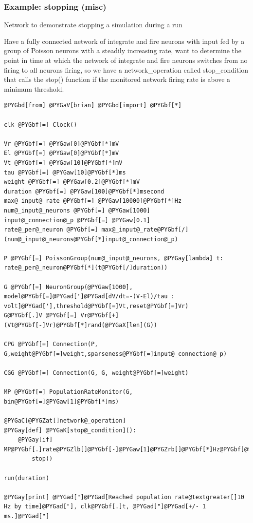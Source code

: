\documentclass[letterpaper,10pt,english]{manual}
\begin{document}
\resetcurrentobjects
\hypertarget{--doc-examples-misc_stopping}{}

\hypertarget{index-85}{}\subsubsection{Example: stopping (misc)}

Network to demonstrate stopping a simulation during a run

Have a fully connected network of integrate and fire neurons
with input fed by a group of Poisson neurons with a steadily
increasing rate, want to determine the point in time at which
the network of integrate and fire neurons switches from no
firing to all neurons firing, so we have a network\_operation
called stop\_condition that calls the stop() function if the
monitored network firing rate is above a minimum threshold.

\begin{Verbatim}[commandchars=@\[\]]
@PYGbd[from] @PYGaV[brian] @PYGbd[import] @PYGbf[*]

clk @PYGbf[=] Clock()

Vr @PYGbf[=] @PYGaw[0]@PYGbf[*]mV
El @PYGbf[=] @PYGaw[0]@PYGbf[*]mV
Vt @PYGbf[=] @PYGaw[10]@PYGbf[*]mV
tau @PYGbf[=] @PYGaw[10]@PYGbf[*]ms
weight @PYGbf[=] @PYGaw[0.2]@PYGbf[*]mV
duration @PYGbf[=] @PYGaw[100]@PYGbf[*]msecond
max@_input@_rate @PYGbf[=] @PYGaw[10000]@PYGbf[*]Hz
num@_input@_neurons @PYGbf[=] @PYGaw[1000]
input@_connection@_p @PYGbf[=] @PYGaw[0.1]
rate@_per@_neuron @PYGbf[=] max@_input@_rate@PYGbf[/](num@_input@_neurons@PYGbf[*]input@_connection@_p)

P @PYGbf[=] PoissonGroup(num@_input@_neurons, @PYGay[lambda] t: rate@_per@_neuron@PYGbf[*](t@PYGbf[/]duration))

G @PYGbf[=] NeuronGroup(@PYGaw[1000], model@PYGbf[=]@PYGad[']@PYGad[dV/dt=-(V-El)/tau : volt]@PYGad['],threshold@PYGbf[=]Vt,reset@PYGbf[=]Vr)
G@PYGbf[.]V @PYGbf[=] Vr@PYGbf[+](Vt@PYGbf[-]Vr)@PYGbf[*]rand(@PYGaX[len](G))

CPG @PYGbf[=] Connection(P, G,weight@PYGbf[=]weight,sparseness@PYGbf[=]input@_connection@_p)

CGG @PYGbf[=] Connection(G, G, weight@PYGbf[=]weight)

MP @PYGbf[=] PopulationRateMonitor(G, bin@PYGbf[=]@PYGaw[1]@PYGbf[*]ms)

@PYGaC[@PYGZat[]network@_operation]
@PYGay[def] @PYGaK[stop@_condition]():
    @PYGay[if] MP@PYGbf[.]rate@PYGZlb[]@PYGbf[-]@PYGaw[1]@PYGZrb[]@PYGbf[*]Hz@PYGbf[@textgreater[]]@PYGaw[10]@PYGbf[*]Hz:
        stop()

run(duration)

@PYGay[print] @PYGad["]@PYGad[Reached population rate@textgreater[]10 Hz by time]@PYGad["], clk@PYGbf[.]t, @PYGad["]@PYGad[+/- 1 ms.]@PYGad["]
\end{Verbatim}
\end{document}
